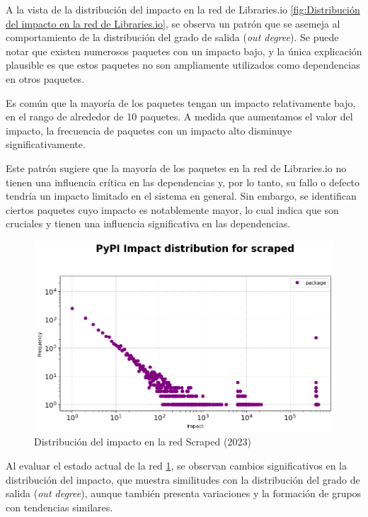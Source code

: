 A la vista de la distribución del impacto en la red de Libraries.io \ref{fig:Distribución del impacto en la red de Libraries.io}, se observa un patrón que se
asemeja al comportamiento de la distribución del grado de salida (\textit{out degree}). Se puede notar
que existen numerosos paquetes con un impacto bajo, y la única explicación plausible es que estos paquetes
no son ampliamente utilizados como dependencias en otros paquetes.

Es común que la mayoría de los paquetes tengan un impacto relativamente bajo, en el rango de alrededor
de 10 paquetes. A medida que aumentamos el valor del impacto, la frecuencia de paquetes con un impacto
alto disminuye significativamente.

Este patrón sugiere que la mayoría de los paquetes en la red de Libraries.io no tienen una influencia
crítica en las dependencias y, por lo tanto, su fallo o defecto tendría un impacto limitado en el
sistema en general. Sin embargo, se
identifican ciertos paquetes cuyo impacto es notablemente mayor, lo cual indica que son cruciales
y tienen una influencia significativa en las dependencias.

\begin{figure}[ht!]
    \begin{center}
        \includegraphics[width=1\textwidth]{img/pypi/scraped_impact_distribution.png}
        \caption{Distribución del impacto en la red Scraped (2023)}
        \label{fig:Distribución del impacto en la red Scraped}
    \end{center}
\end{figure}

Al evaluar el estado actual de la red \ref{fig:Distribución del impacto en la red Scraped}, se observan cambios significativos en la distribución del
impacto, que muestra similitudes con la distribución del grado de salida (\textit{out degree}),
aunque también presenta variaciones y la formación de grupos con tendencias similares.

